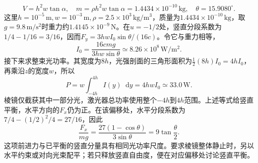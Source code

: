\documentclass[UTF8,fontset=fandol,a4paper,11pt]{ctexart}
\newcommand{\dd}{\mathop{}\!\mathrm{d}}
\begin{document}
\[
V=h^2w\tan\alpha,\quad m=\rho h^2w\tan\alpha=1.4434\times10^{-10}\,\mathrm{kg},
\quad \theta=15.9080^\circ.
\]
这里$h=10^{-5}\,\mathrm m,w=10^{-3}\,\mathrm m,\rho=2.5\times10^3\,\mathrm{kg/m^3}$，质量为$1.4434\times10^{-10}\,\mathrm{kg}$，取$g=9.8\,\mathrm{m/s^2}$时重力约$1.4145\times10^{-9}\,\mathrm N$。在$u=-1/2$处，竖直分段系数为$1/4-1/16=3/16$，因而$F_y=3hwI_0\sin\theta/(16c)$。令它与重力相等，
\[
I_0=\frac{16cmg}{3hw\sin\theta}\simeq8.26\times10^8\,\mathrm{W/m^2}.
\]
接下来求整束光功率。其宽度为$8h$，光强剖面的三角形面积为$\tfrac12(8h)I_0=4hI_0$，再乘沿$z$的宽度$w$，所以
\[
\boxed{P=w\int_{-4h}^{4h}I(y)\dd y=4hwI_0\simeq33.0\,\mathrm W}.
\]
棱镜仅截获其中一部分光，激光器总功率使用整个$-4h$到$4h$范围。上述等式给竖直平衡，水平方向的$F_x$仍为正。在该偏移处，水平分段系数为$7/4-(1/2)^2/4=27/16$，因此
\[
 \frac{F_x}{mg}=\frac{27(1-\cos\theta)}{3\sin\theta}
 =9\tan\frac{\theta}{2}.
\]
这项前进力与已平衡的竖直分量具有相同光功率尺度。要求棱镜整体静止时，另以水平约束或对向光束配平；若只释放竖直自由度，便在对应偏移处讨论竖直平衡。
\end{document}

